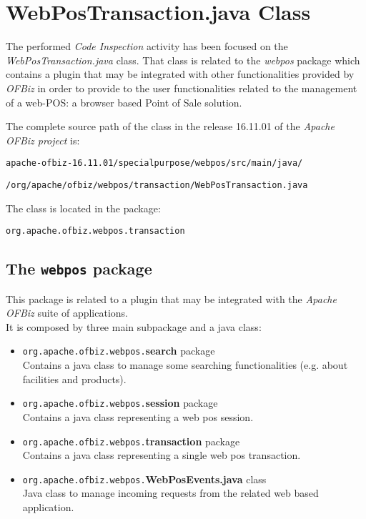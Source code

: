 \section{WebPosTransaction.java Class}
The performed \emph{Code Inspection} activity has been focused on the \emph{WebPosTransaction.java} class. That class is related to the \emph{webpos} package which contains a plugin that may be integrated with other functionalities provided by \textit{OFBiz} in order to provide to the user functionalities related to the management of a web-POS: a browser based Point of Sale solution.

The complete source path of the class in the release 16.11.01 of the \emph{Apache OFBiz project} is:\\

\centerline{\tt apache-ofbiz-16.11.01/specialpurpose/webpos/src/main/java/}
\centerline{\tt /org/apache/ofbiz/webpos/transaction/WebPosTransaction.java} \hfill

The class is located in the package:\\
\centerline{\tt org.apache.ofbiz.webpos.transaction}

\subsection{The \texttt{webpos} package}
This package is related to a plugin that may be integrated with the \emph{Apache OFBiz} suite of applications.\\
It is composed by three main subpackage and a java class:
\begin{itemize}
	\item \texttt{org.apache.ofbiz.webpos.}\textbf{search} package\\Contains a java class to manage some searching functionalities (e.g. about facilities and products).
	\item \texttt{org.apache.ofbiz.webpos.}\textbf{session} package\\Contains a java class representing a web pos session.
	\item \texttt{org.apache.ofbiz.webpos.}\textbf{transaction} package\\Contains a java class representing  a single web pos transaction.
	\item \texttt{org.apache.ofbiz.webpos.}\textbf{WebPosEvents.java} class\\Java class to manage incoming requests from the related web based application.
\end{itemize}

